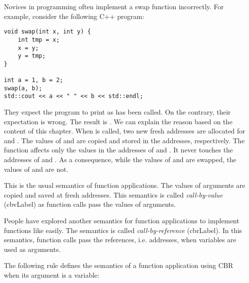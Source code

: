 Novices in programming often implement a swap function incorrectly. For example,
consider the following C++ program:

\begin{verbatim}
void swap(int x, int y) {
    int tmp = x;
    x = y;
    y = tmp;
}

int a = 1, b = 2;
swap(a, b);
std::cout << a << " " << b << std::endl;
\end{verbatim}

They expect the program to print  as  has been called.
On the contrary, their expectation is wrong. The result is .
We can explain the reason based on
the content of this chapter. When  is called, two new fresh addresses
are allocated for  and . The values of  and  are
copied and stored in the addresses, respectively. The function affects only the values in
the addresses of  and . It never touches the addresses of
 and . As a consequence, while the values of  and
 are swapped, the values of  and  are not.

This is the usual semantics of function applications. The values of arguments are
copied and saved at fresh addresses. This semantics is called
\textit{call-by-value} (\acrshort{cbvLabel})
as function calls pass the values of arguments.

People have explored another semantics for function applications to implement
functions like  easily. The semantics is called
\textit{call-by-reference} (\acrshort{cbrLabel}).
In this semantics, function calls pass the references, i.e. addresses,
when variables are used as arguments.

The following rule defines the semantics of a function application using CBR when its
argument is a variable:



